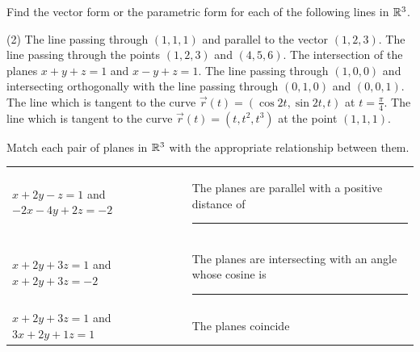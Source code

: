 \documentclass{discussion}
\author{Sections B04 and B06}
\date{Fall 2024}
\begin{document}
\begin{question}
    Find the vector form or the parametric form for each of the following lines in \(\mathbb{R}^3\).
    \begin{tasks}(2)
        \task The line passing through \((1, 1, 1)\) and parallel to the vector \((1, 2, 3)\).
        \task The line passing through the points \((1, 2, 3)\) and \((4, 5, 6)\).
        \task The intersection of the planes \(x + y + z = 1\) and \(x - y + z = 1\).
        \task The line passing through \((1, 0, 0)\) and intersecting orthogonally with the line passing through \((0, 1, 0)\) and \((0, 0, 1)\).
        \task The line which is tangent to the curve \(\vec{r}(t) = \left( \cos 2t, \sin 2t, t \right)\) at \(t = \frac{\pi}{4}\).
        \task The line which is tangent to the curve \(\vec{r}(t) = \left( t, t^2, t^3 \right)\) at the point \((1, 1, 1)\).
    \end{tasks}
\end{question}

\vspace{80pt}

\begin{question}
    Match each pair of planes in \(\mathbb{R}^3\) with the appropriate relationship between them.

    \begin{center}
        \setlength{\tabcolsep}{2em}
        \begin{tabularx}{\textwidth}{lX}
            \(x + 2y - z = 1\) and \(-2 x - 4 y + 2z = -2\) & \linespread{1.4}\selectfont The planes are parallel with a positive distance of \rule{1.5cm}{0.15mm} \vspace{40pt} \\
            \(x + 2y + 3z = 1\) and \(x + 2y + 3z = -2\) & \linespread{1.4}\selectfont The planes are intersecting with an angle whose cosine is \rule{1.5cm}{0.15mm} \vspace{40pt} \\
            \(x + 2y + 3z = 1\) and \(3x + 2y + 1 z = 1\) & The planes coincide
        \end{tabularx}
    \end{center}
\end{question}
\end{document}
